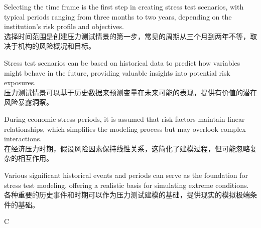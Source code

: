 \documentclass{article}
\begin{document}
    \begin{choices}
        \item Selecting the time frame is the first step in creating stress test scenarios, with typical periods ranging from three months to two years, depending on the institution's risk profile and objectives.\\
        选择时间范围是创建压力测试情景的第一步，常见的周期从三个月到两年不等，取决于机构的风险概况和目标。
        \item Stress test scenarios can be based on historical data to predict how variables might behave in the future, providing valuable insights into potential risk exposures.\\
        压力测试情景可以基于历史数据来预测变量在未来可能的表现，提供有价值的潜在风险暴露洞察。
        \item During economic stress periods, it is assumed that risk factors maintain linear relationships, which simplifies the modeling process but may overlook complex interactions.\\
        在经济压力时期，假设风险因素保持线性关系，这简化了建模过程，但可能忽略复杂的相互作用。
        \item Various significant historical events and periods can serve as the foundation for stress test modeling, offering a realistic basis for simulating extreme conditions.\\
        各种重要的历史事件和时期可以作为压力测试建模的基础，提供现实的模拟极端条件的基础。
    \end{choices}
    
    \begin{correctanswer}
        C
    \end{correctanswer}
    
\end{document}
